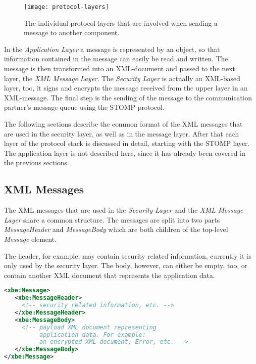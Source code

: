 \begin{figure}[ht]
  \centering
  \texttt{[image: protocol-layers]}
  \caption[Protocol  Layers]{The  individual   protocol  layers  that  are
    involved when sending a message to another component.}
  \label{fig:communication-layers}
\end{figure}

In the \emph{Application Layer} a  message is represented by an object, so
that information contained in the  message can easily be read and written.
The message  is then  transformed into an  XML-document and passed  to the
next layer, \ie the \emph{XML Message Layer}. The \emph{Security Layer} is
actually  an XML-based  layer,  too,  it signs  and  encrypts the  message
received from  the upper layer in  an XML-message.  The final  step is the
sending of the message  to the communication partner's message-queue using
the STOMP protocol.

\medskip

The following sections describe the common format of the XML messages that
are used  in the security  layer, as well  as in the message  layer. After
that each  layer of  the protocol stack  is discussed in  detail, starting
with the STOMP layer.  The  application layer is not described here, since
it has already been covered in the previous sections.

\subsection{XML Messages}

The  XML messages  that  are used  in  the \emph{Security  Layer} and  the
\emph{XML Message Layer} share a  common structure. The messages are split
into two parts \emph{MessageHeader}  and \emph{MessageBody} which are both
children of the top-level \emph{Message} element.

The  header,  for  example,  may  contain  security  related  information,
currently it is  only used by the security layer.   The body, however, can
either be empty, too, or  contain another XML document that represents the
application data.

\bigskip
\begin{center}
  \begin{minipage}{.75\textwidth}
    \begin{lstlisting}[captionpos=b,backgroundcolor=\color{listingcolor},frame=lines,numbers=none,stepnumber=5,numberfirstline=false,numberstyle=\tiny,caption={The
        structure of an XML message.},label={lst:xml-message-example},language=XML]
<xbe:Message>
   <xbe:MessageHeader>
     <!-- security related information, etc. -->
   </xbe:MessageHeader>
   <xbe:MessageBody>
     <!-- payload XML document representing
          application data. For example:
          an encrypted XML document, Error, etc. -->
   </xbe:MessageBody>
</xbe:Message>
    \end{lstlisting}
  \end{minipage}
\end{center}
\medskip

